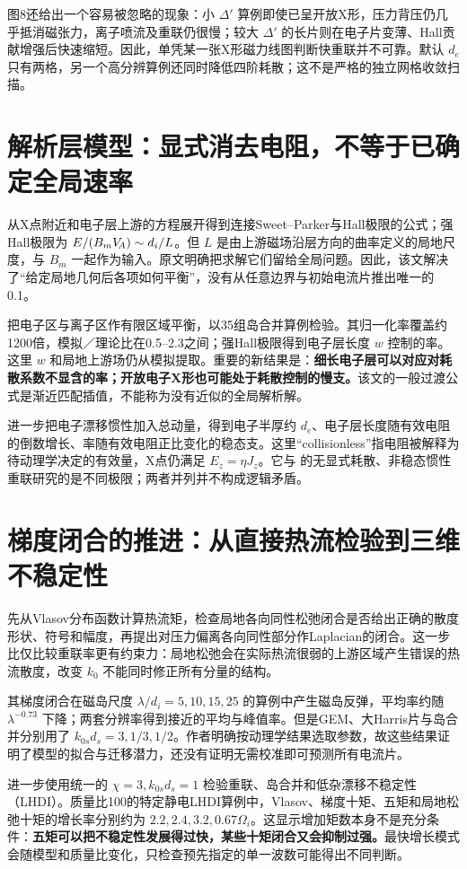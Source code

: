 图8还给出一个容易被忽略的现象：小 $\Delta'$ 算例即使已呈开放X形，压力背压仍几乎抵消磁张力，离子喷流及重联仍很慢；较大 $\Delta'$ 的长片则在电子片变薄、Hall贡献增强后快速缩短。因此，单凭某一张X形磁力线图判断快重联并不可靠。默认 $d_e$ 只有两格，另一个高分辨算例还同时降低四阶耗散；这不是严格的独立网格收敛扫描。

\section{解析层模型：显式消去电阻，不等于已确定全局速率}
\citet{Malyshkin2008}从X点附近和电子层上游的方程展开得到连接Sweet--Parker与Hall极限的公式；强Hall极限为 $E/(B_mV_{\!A})\sim d_i/L$。但 $L$ 是由上游磁场沿层方向的曲率定义的局地尺度，与 $B_m$ 一起作为输入。原文明确把求解它们留给全局问题。因此，该文解决了“给定局地几何后各项如何平衡”，没有从任意边界与初始电流片推出唯一的0.1。

\citet{Simakov2009}把电子区与离子区作有限区域平衡，以35组岛合并算例检验。其归一化率覆盖约1200倍，模拟／理论比在0.5--2.3之间；强Hall极限得到电子层长度 $w$ 控制的率。这里 $w$ 和局地上游场仍从模拟提取。重要的新结果是：\textbf{细长电子层可以对应对耗散系数不显含的率；开放电子X形也可能处于耗散控制的慢支。}该文的一般过渡公式是渐近匹配插值，不能称为没有近似的全局解析解。

\citet{Malyshkin2009}进一步把电子漂移惯性加入总动量，得到电子半厚约 $d_e$、电子层长度随有效电阻的倒数增长、率随有效电阻正比变化的稳态支。这里“collisionless”指电阻被解释为待动理学决定的有效量，X点仍满足 $E_z=\eta J_z$。它与 \citet{Andres2014} 的无显式耗散、非稳态惯性重联研究的是不同极限；两者并列并不构成逻辑矛盾。

\section{梯度闭合的推进：从直接热流检验到三维不稳定性}
\citet{L256}先从Vlasov分布函数计算热流矩，检查局地各向同性松弛闭合是否给出正确的散度形状、符号和幅度，再提出对压力偏离各向同性部分作Laplacian的闭合。这一步比仅比较重联率更有约束力：局地松弛会在实际热流很弱的上游区域产生错误的热流散度，改变 $k_0$ 不能同时修正所有分量的结构。

其梯度闭合在磁岛尺度 $\lambda/d_i=5,10,15,25$ 的算例中产生磁岛反弹，平均率约随 $\lambda^{-0.73}$ 下降；两套分辨率得到接近的平均与峰值率。但是GEM、大Harris片与岛合并分别用了 $k_{0s}d_s=3,1/3,1/2$。作者明确按动理学结果选取参数，故这些结果证明了模型的拟合与迁移潜力，还没有证明无需校准即可预测所有电流片。

\citet{E552}进一步使用统一的 $\chi=3,k_{0s}d_s=1$ 检验重联、岛合并和低杂漂移不稳定性（LHDI）。质量比100的特定静电LHDI算例中，Vlasov、梯度十矩、五矩和局地松弛十矩的增长率分别约为 $2.2,2.4,3.2,0.67\Omega_i$。这显示增加矩数本身不是充分条件：\textbf{五矩可以把不稳定性发展得过快，某些十矩闭合又会抑制过强。}最快增长模式会随模型和质量比变化，只检查预先指定的单一波数可能得出不同判断。

